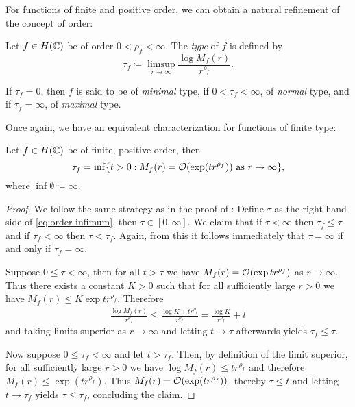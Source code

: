 For functions of finite and positive order, we can obtain a natural refinement of the concept of order:

\begin{definition}
    Let $f \in H(\mathbb{C})$ be of order $0 < \rho_f < \infty$. The \emph{type} of $f$ is defined by
    \begin{equation} \label{eq:def-type}
        \tau_f \coloneqq \limsup_{r \to \infty} \frac{\log M_f(r)}{r^{\rho_f}}.
    \end{equation}

    If $\tau_f = 0$, then $f$ is said to be of \emph{minimal} type, if $0 < \tau_f < \infty$, of \emph{normal} type, and if $\tau_f = \infty$, of \emph{maximal} type.
\end{definition}

Once again, we have an equivalent characterization for functions of finite type:

\begin{proposition} \label{prop:type-infimum}
    Let $f \in H(\mathbb{C})$ be of finite, positive order, then
    \begin{equation} \label{eq:type-infimum}
        \tau_f = \inf \{ t > 0 : M_f(r) = \mathcal{O}(\exp (t r^{\rho_f})) \textrm{ as } r \to \infty \},
    \end{equation}
    where $\inf \emptyset \coloneqq \infty$.
\end{proposition}

\begin{proof}
    We follow the same strategy as in the proof of : Define $\tau$ as the right-hand side of \eqref{eq:order-infimum}, then $\tau \in [0, \infty]$. We claim that if $\tau < \infty$ then $\tau_f \leq \tau$ and if $\tau_f < \infty$ then $\tau < \tau_f$. Again, from this it follows immediately that $\tau = \infty$ if and only if $\tau_f = \infty$.

    Suppose $0 \leq \tau < \infty$, then for all $t > \tau$ we have $M_f(r) = \mathcal{O}(\exp t r^{\rho_f})$ as $r \to \infty$. Thus there exists a constant $K > 0$ such that for all sufficiently large $r > 0$ we have $M_f(r) \leq K \exp t r^{\rho_f}$. Therefore
    \begin{align*}
        \frac{\log M_f(r)}{r^{\rho_f}} \leq \frac{\log K + t r^{\rho_f}}{r^{\rho_f}} = \frac{\log K}{r^{\rho_f}} + t
    \end{align*}
    and taking limits superior as $r \to \infty$ and letting $t \to \tau$ afterwards yields $\tau_f \leq \tau$.

    Now suppose $0 \leq \tau_f < \infty$ and let $t > \tau_f$. Then, by definition of the limit superior, for all sufficiently large $r > 0$ we have $ \log M_f(r) \leq t r^{\rho_f}$ and therefore $M_f(r) \leq \exp(t r^{\rho_f})$. Thus $M_f(r) = \mathcal{O}(\exp (t r^{\rho_f}))$, thereby $\tau \leq t$ and letting $t \to \tau_f$ yields $\tau \leq \tau_f$, concluding the claim.
\end{proof}

